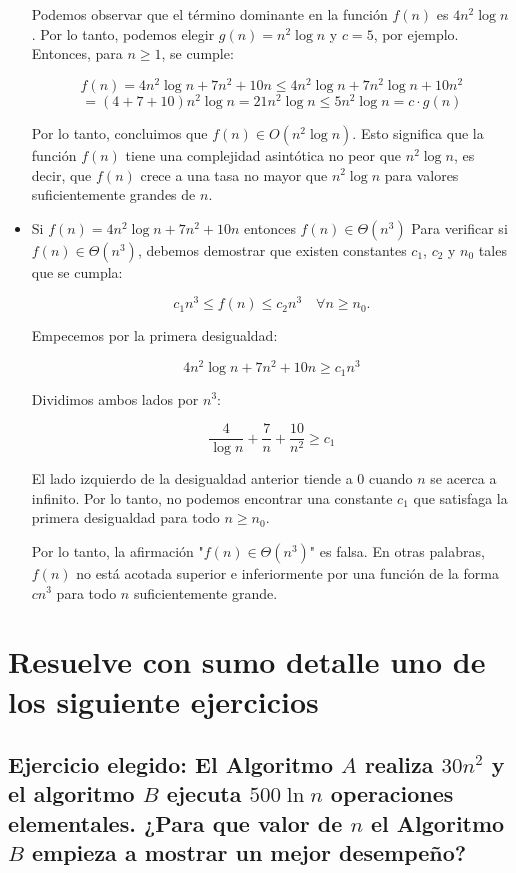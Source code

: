 \begin{itemize}
	      Podemos observar que el término dominante en la función $f(n)$ es $4 n^2 \log n$.
	      Por lo tanto, podemos elegir $g(n) = n^2 \log n$ y $c = 5$, por ejemplo. Entonces, para $n \geq 1$, se cumple:

	      $$f(n) = 4 n^2 \log n + 7n^2 + 10n \leq 4n^2 \log n + 7n^2 \log n + 10n^2$$
	      $$= (4+7+10) n^2 \log n = 21 n^2 \log n \leq 5 n^2 \log n = c \cdot g(n)$$

	      Por lo tanto, concluimos que $f(n) \in O(n^2 \log n)$. Esto significa que la función $f(n)$
	      tiene una complejidad asintótica no peor que $n^2 \log n$, es decir, que $f(n)$ crece a una tasa no mayor que $n^2 \log n$
	      para valores suficientemente grandes de $n$.

	\item Si $f(n) = 4 n^2 \log n + 7n^2 + 10n$ entonces $f(n) \in \Theta (n^3)$
	      Para verificar si $f(n) \in \Theta(n^3)$, debemos demostrar que existen constantes $c_1$, $c_2$ y $n_0$ tales que se cumpla:

	      $$c_1 n^3 \leq f(n) \leq c_2 n^3 \quad \forall n \geq n_0.$$

	      Empecemos por la primera desigualdad:

	      $$4n^2\log n + 7n^2 + 10n \geq c_1 n^3$$

	      Dividimos ambos lados por $n^3$:

	      $$\frac{4}{\log n} + \frac{7}{n} + \frac{10}{n^2} \geq c_1$$

	      El lado izquierdo de la desigualdad anterior tiende a 0 cuando $n$ se acerca a infinito.
	      Por lo tanto, no podemos encontrar una constante $c_1$ que satisfaga la primera desigualdad para todo $n \geq n_0$.

	      Por lo tanto, la afirmación "$f(n) \in \Theta(n^3)$" es falsa. En otras palabras, $f(n)$ no está acotada superior e inferiormente por una función de la forma
	      $c n^3$ para todo $n$ suficientemente grande.

\end{itemize}
\newpage
\section{Resuelve con sumo detalle uno de los siguiente ejercicios}

\subsection{Ejercicio elegido: El Algoritmo $A$ realiza $30n^2$ y el algoritmo $B$ ejecuta $500 \ln n$ operaciones elementales.
	¿Para que valor de $n$ el Algoritmo $B$ empieza a mostrar un mejor desempeño?}

